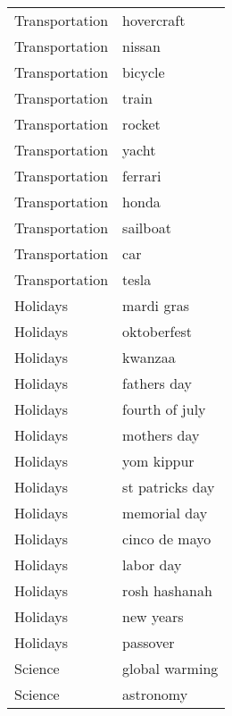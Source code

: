 \begin{supertabular}{l p{0.25\textwidth}}
   Transportation &                         hovercraft \\
   Transportation &                             nissan \\
   Transportation &                            bicycle \\
   Transportation &                              train \\
   Transportation &                             rocket \\
   Transportation &                              yacht \\
   Transportation &                            ferrari \\
   Transportation &                              honda \\
   Transportation &                           sailboat \\
   Transportation &                                car \\
   Transportation &                              tesla \\
         Holidays &                         mardi gras \\
         Holidays &                        oktoberfest \\
         Holidays &                            kwanzaa \\
         Holidays &                        fathers day \\
         Holidays &                     fourth of july \\
         Holidays &                        mothers day \\
         Holidays &                         yom kippur \\
         Holidays &                    st patricks day \\
         Holidays &                       memorial day \\
         Holidays &                      cinco de mayo \\
         Holidays &                          labor day \\
         Holidays &                      rosh hashanah \\
         Holidays &                          new years \\
         Holidays &                           passover \\
          Science &                     global warming \\
          Science &                          astronomy \\

\end{supertabular}
